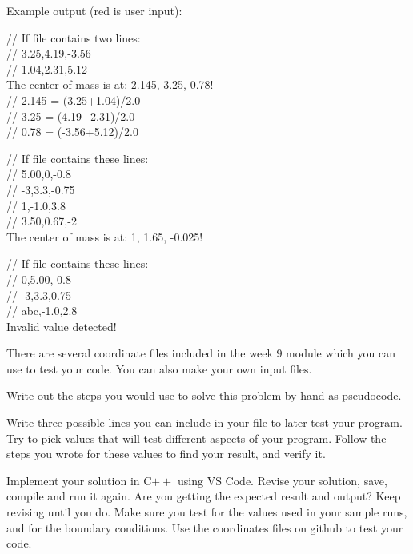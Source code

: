 Example output (red is user input):

\begin{sample}
// If file contains two lines: \\
// 3.25,4.19,-3.56 \\
// 1.04,2.31,5.12 \\
The center of mass is at: 2.145, 3.25, 0.78! \\
// 2.145 = (3.25+1.04)/2.0 \\
// 3.25 = (4.19+2.31)/2.0 \\
// 0.78 = (-3.56+5.12)/2.0 \\
\end{sample}

\begin{sample} %
// If file contains these lines: \\
// 5.00,0,-0.8 \\
// -3,3.3,-0.75 \\
// 1,-1.0,3.8 \\
// 3.50,0.67,-2 \\
The center of mass is at: 1, 1.65, -0.025!
\end{sample}

\begin{sample}
// If file contains these lines: \\
// 0,5.00,-0.8 \\
// -3,3.3,0.75 \\
// abc,-1.0,2.8 \\
Invalid value detected!
\end{sample}

There are several coordinate files included in the week 9 module which you can use to test your code. You can also make your own input files.

\newpage

\begin{multipart}
Write out the steps you would use to solve this problem by hand as pseudocode. 
\end{multipart}

\vspace{10cm}

\begin{multipart}
Write three possible lines you can include in your file to later test your program. Try to pick values that will test different aspects of your program. Follow the steps you wrote for these values to find your result, and verify it.
\end{multipart}

\vspace{5cm}

\begin{multipart}
Implement your solution in C$++$ using VS Code. Revise your solution, save, compile and run it again. Are you getting the expected result and output? Keep revising until you do. Make sure you test for the values used in your sample runs, and for the boundary conditions. Use the coordinates files on github to test your code.
\end{multipart}

